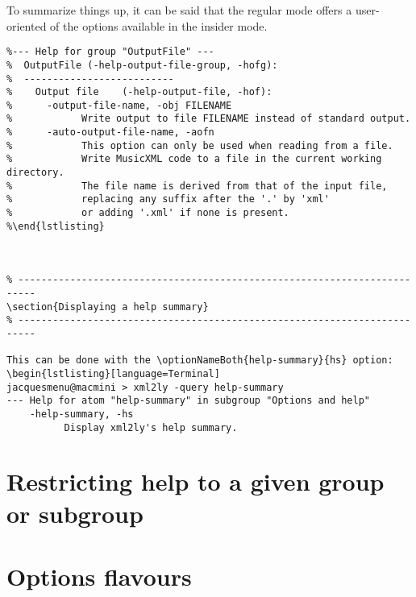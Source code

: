 To summarize things up, it can be said that the regular mode offers a user-oriented  of the options available in the insider mode.

%
\begin{lstlisting}[language=Terminal]
%jacquesmenu@macmini: ~ > xml2ly -help-output-file-group -insider
%--- Help for group "OutputFile" ---
%  OutputFile (-help-output-file-group, -hofg):
%  --------------------------
%    Output file    (-help-output-file, -hof):
%      -output-file-name, -obj FILENAME
%            Write output to file FILENAME instead of standard output.
%      -auto-output-file-name, -aofn
%            This option can only be used when reading from a file.
%            Write MusicXML code to a file in the current working directory.
%            The file name is derived from that of the input file,
%            replacing any suffix after the '.' by 'xml'
%            or adding '.xml' if none is present.
%\end{lstlisting}



\section{Displaying a help summary}

This can be done with the \optionNameBoth{help-summary}{hs} option:
\begin{lstlisting}[language=Terminal]
jacquesmenu@macmini > xml2ly -query help-summary
--- Help for atom "help-summary" in subgroup "Options and help"
    -help-summary, -hs
          Display xml2ly's help summary.
\end{lstlisting}

\section{Restricting help to a given group or subgroup}


\section{Options flavours}

